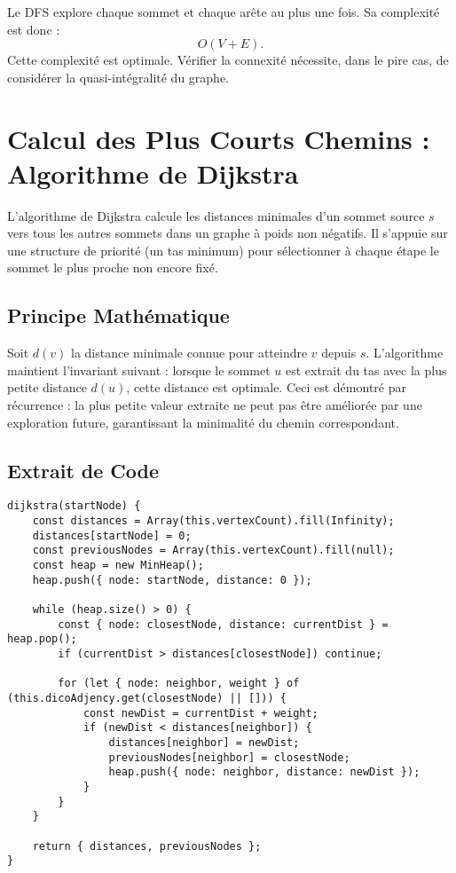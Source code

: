 \documentclass[a4paper,12pt]{article}
\begin{document}
Le DFS explore chaque sommet et chaque arête au plus une fois. Sa complexité est donc :
\[
O(V+E).
\]
Cette complexité est optimale. Vérifier la connexité nécessite, dans le pire cas, de considérer la quasi-intégralité du graphe.

\section{Calcul des Plus Courts Chemins : Algorithme de Dijkstra}

L'algorithme de Dijkstra calcule les distances minimales d’un sommet source $s$ vers tous les autres sommets dans un graphe à poids non négatifs. Il s’appuie sur une structure de priorité (un tas minimum) pour sélectionner à chaque étape le sommet le plus proche non encore fixé.

\subsection{Principe Mathématique}

Soit $d(v)$ la distance minimale connue pour atteindre $v$ depuis $s$. L’algorithme maintient l’invariant suivant : lorsque le sommet $u$ est extrait du tas avec la plus petite distance $d(u)$, cette distance est optimale. Ceci est démontré par récurrence : la plus petite valeur extraite ne peut pas être améliorée par une exploration future, garantissant la minimalité du chemin correspondant.

\subsection{Extrait de Code}

\begin{verbatim}
dijkstra(startNode) {
    const distances = Array(this.vertexCount).fill(Infinity);
    distances[startNode] = 0;
    const previousNodes = Array(this.vertexCount).fill(null);
    const heap = new MinHeap();
    heap.push({ node: startNode, distance: 0 });

    while (heap.size() > 0) {
        const { node: closestNode, distance: currentDist } = heap.pop();
        if (currentDist > distances[closestNode]) continue;

        for (let { node: neighbor, weight } of (this.dicoAdjency.get(closestNode) || [])) {
            const newDist = currentDist + weight;
            if (newDist < distances[neighbor]) {
                distances[neighbor] = newDist;
                previousNodes[neighbor] = closestNode;
                heap.push({ node: neighbor, distance: newDist });
            }
        }
    }

    return { distances, previousNodes };
}
\end{verbatim}
\end{document}
